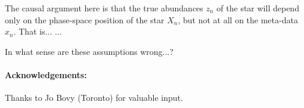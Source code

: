 \documentclass[12pt, letterpaper]{article}
\begin{document}
The causal argument here is that the true abundances $z_n$ of the star
will depend only on the phase-space position of the star $X_n$, but not at
all on the meta-data $x_n$.
That is...
...

In what sense are these assumptions wrong...?

\paragraph{Acknowledgements:}
Thanks to Jo Bovy (Toronto) for valuable input.
\end{document}
